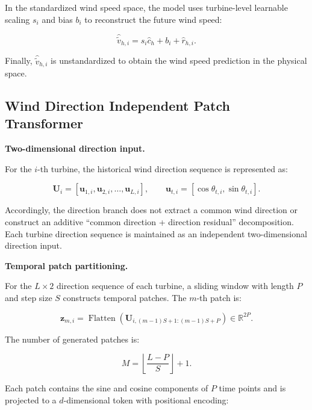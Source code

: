 In the standardized wind speed space, the model uses turbine-level learnable scaling $s_i$ and bias $b_i$ to reconstruct the future wind speed:

\begin{equation}
\hat{\tilde{v}}_{h,i} = s_i\hat{c}_h + b_i + \hat{r}_{h,i}.
\end{equation}

Finally, $\hat{\tilde{v}}_{h,i}$ is unstandardized to obtain the wind speed prediction in the physical space.

\subsection{Wind Direction Independent Patch Transformer}

\textbf{Two-dimensional direction input.}

For the $i$-th turbine, the historical wind direction sequence is represented as:

\begin{equation}
\mathbf{U}_i = \left[ \mathbf{u}_{1,i}, \mathbf{u}_{2,i}, \ldots, \mathbf{u}_{L,i} \right], \qquad \mathbf{u}_{t,i} = [\cos\theta_{t,i}, \sin\theta_{t,i}].
\end{equation}

Accordingly, the direction branch does not extract a common wind direction or construct an additive ``common direction + direction residual'' decomposition. Each turbine direction sequence is maintained as an independent two-dimensional direction input.

\textbf{Temporal patch partitioning.}

For the $L\times 2$ direction sequence of each turbine, a sliding window with length $P$ and step size $S$ constructs temporal patches. The $m$-th patch is:

\begin{equation}
\mathbf{z}_{m,i} = \operatorname{Flatten} \left( \mathbf{U}_{i,(m-1)S+1:(m-1)S+P} \right) \in \mathbb{R}^{2P}.
\end{equation}

The number of generated patches is:

\begin{equation}
M = \left\lfloor \frac{L-P}{S} \right\rfloor+1.
\end{equation}

Each patch contains the sine and cosine components of $P$ time points and is projected to a $d$-dimensional token with positional encoding:

